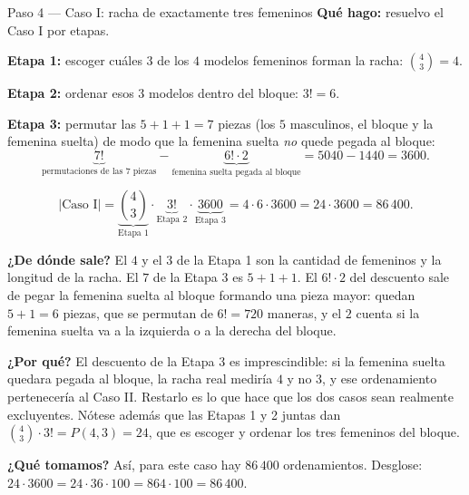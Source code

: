 \documentclass[11pt]{article}
\begin{document}
\begin{paso}{Paso 4 --- Caso I: racha de exactamente tres femeninos}
\textbf{Qué hago:} resuelvo el Caso I por etapas.

\medskip
\textbf{Etapa 1:} escoger cuáles $3$ de los $4$ modelos femeninos forman la racha: $\displaystyle\binom{4}{3}=4$.

\textbf{Etapa 2:} ordenar esos $3$ modelos dentro del bloque: $3!=6$.

\textbf{Etapa 3:} permutar las $5+1+1=7$ piezas (los $5$ masculinos, el bloque y la femenina suelta) de modo que la femenina suelta \emph{no} quede pegada al bloque:
\[
  \underbrace{7!}_{\text{permutaciones de las 7 piezas}} - \underbrace{6!\cdot 2}_{\text{femenina suelta pegada al bloque}} = 5040 - 1440 = 3600 .
\]

\medskip
\[
  |\text{Caso I}| = \underbrace{\binom{4}{3}}_{\text{Etapa 1}}\cdot \underbrace{3!}_{\text{Etapa 2}}\cdot \underbrace{3600}_{\text{Etapa 3}} = 4\cdot 6\cdot 3600 = 24\cdot 3600 = 86\,400 .
\]

\textbf{¿De dónde sale?} El $4$ y el $3$ de la Etapa 1 son la cantidad de femeninos y la longitud de la racha. El $7$ de la Etapa 3 es $5+1+1$. El $6!\cdot 2$ del descuento sale de pegar la femenina suelta al bloque formando una pieza mayor: quedan $5+1=6$ piezas, que se permutan de $6!=720$ maneras, y el $2$ cuenta si la femenina suelta va a la izquierda o a la derecha del bloque.

\textbf{¿Por qué?} El descuento de la Etapa 3 es imprescindible: si la femenina suelta quedara pegada al bloque, la racha real mediría $4$ y no $3$, y ese ordenamiento pertenecería al Caso II. Restarlo es lo que hace que los dos casos sean realmente excluyentes. Nótese además que las Etapas 1 y 2 juntas dan $\binom{4}{3}\cdot 3! = P(4,3) = 24$, que es escoger y ordenar los tres femeninos del bloque.

\textbf{¿Qué tomamos?} Así, para este caso hay $86\,400$ ordenamientos. Desglose: $24\cdot 3600 = 24\cdot 36\cdot 100 = 864\cdot 100 = 86\,400$.
\end{paso}
\end{document}
